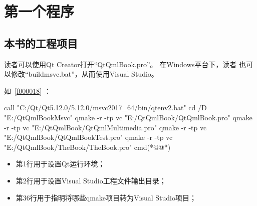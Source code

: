 ﻿




%

\FloatBarrier
\section{
第一个程序
}\label{s100210}


\FloatBarrier
\subsection{
本书的工程项目
}\label{ss001u10}


读者可以使用Qt Creator打开“QtQmlBook.pro”。
在Windows平台下，读者
也可以修改“build\underline{\hspace{0.5em}}msvc.bat”，从而使用Visual Studio。

如\lstlistingname\ \ref{f000018} ：


\FloatBarrier
\begin{thebookfilesourceone}[escapeinside={(*@}{@*)},
label=f000018,
caption=GoodLuck,
title=\lstlistingname \thelstlisting
]
call "C:/Qt/Qt5.12.0/5.12.0/msvc2017_64/bin/qtenv2.bat"
cd /D "E:/QtQmlBookMsvc"
qmake -r -tp vc "E:/QtQmlBook/QtQmlBook.pro"
qmake -r -tp vc "E:/QtQmlBook/QtQmlMultimedia.pro"
qmake -r -tp vc "E:/QtQmlBook/QtQmlBookTest.pro"
qmake -r -tp vc "E:/QtQmlBook/TheBook/TheBook.pro"
cmd(*@\marginpar[\hfill\setlength\fboxsep{2pt}\fbox{\footnotesize{\kaishu\parbox{1em}{\setlength{\baselineskip}{2pt}\lstlistingname}}\footnotesize{\thelstlisting}}]{\setlength\fboxsep{2pt}\fbox{\footnotesize{\kaishu\parbox{1em}{\setlength{\baselineskip}{2pt}\lstlistingname}}\footnotesize{\thelstlisting}}}@*)\end{thebookfilesourceone}          %



\begin{itemize}

\item 第1行用于设置Qt运行环境；
\item 第2行用于设置Visual Studio工程文件输出目录；
\item 第3\raisebox{0.16ex}{\sourcefonttwo\~{}}6行用于指明将哪些qmake项目转为Visual Studio项目；

\end{itemize}

